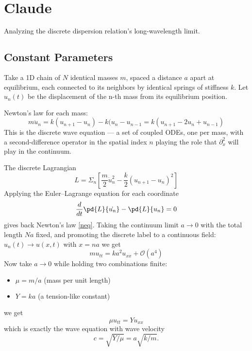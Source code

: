 \chapter{Claude}
Analyzing the discrete dispersion relation's long-wavelength limit.
\section{Constant Parameters}

Take a 1D chain of $N$ identical masses $m$, spaced a distance $a$ apart at
equilibrium, 
each connected to its neighbors by identical springs of stiffness $k$.
Let $ u_n(t) $ be the displacement of the n-th mass from its equilibrium 
position.

Newton's law for each mass:
\begin{equation}
   \label {neq}
    m \ddot u_n=k(u_{n+1}-u_n)-k(u_n-u_{n-1}=k(u_{n+1}-2 u_{n}+u_{n-1})
\end{equation}
This is the discrete wave equation — a set of coupled ODEs, one per mass, with
a second-difference operator in the spatial index $n$ playing the role that 
$ \partial^2_x $ will play in the continuum.

The discrete Lagrangian
\begin{equation}
   \label {dlag}
    L=\Sigma_n \left[\frac{m}{2}{\dot u}_n^2-\frac{k}{2}(u_{n+1}-u_n)^2 \right]
\end{equation}
Applying the Euler–Lagrange equation for each coordinate 
\begin{equation}
   \label {dELe}
    \frac{d}{d t}\pd{L}{\dot {u_n}}-\pd{L}{u_n}=0
\end{equation}
gives back Newton's law \eqref{neq}.
Taking the continuum limit $ a \to 0 $ with the total length $Na$ fixed,
and promoting the discrete label to a continuous field: $ u_n(t) \to u(x,t) $
with $x=na$ we get
\begin{equation}
   \label {ne1}
    m u_{tt}=k a^2 u_{xx} + \mathcal{O}(a^4)
\end{equation}
Now take $a \to 0$ while holding two combinations finite:
\begin{itemize}
    \item $\mu=m/a$ (mass per unit length)
       \item $ Y=ka $ (a tension-like constant)
\end{itemize}
we get 
\begin{equation}
   \label {we}
    \mu u_{tt}= Y u_{xx}
\end{equation}
which is exactly the wave equation with wave velocity 
\begin{equation}
   \label {wv}
   c= \sqrt{Y/\mu} =a \sqrt{k/m}.
\end{equation}

